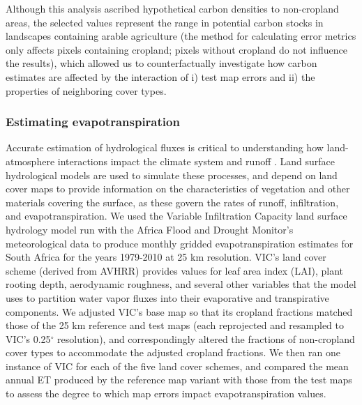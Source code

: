 \documentclass[12 pt, titlepage, a4paper]{article}
\begin{document}
Although this analysis ascribed hypothetical carbon densities to non-cropland areas, the selected values represent the range in potential carbon stocks in landscapes containing arable agriculture (the method for calculating error metrics only affects pixels containing cropland; pixels without cropland do not influence the results), which allowed us to counterfactually investigate how carbon estimates are affected by the interaction of i) test map errors and ii) the properties of neighboring cover types. 

\vspace{-0.3 cm}
\subsubsection*{Estimating evapotranspiration}
\vspace{-0.2 cm}
Accurate estimation of hydrological fluxes is critical to understanding how land-atmosphere interactions impact the climate system and runoff \citep{liang_simple_1994}. Land surface hydrological models are used to simulate these processes, and depend on land cover maps to provide information on the characteristics of vegetation and other materials covering the surface, as these govern the rates of runoff, infiltration, and evapotranspiration. We used the Variable Infiltration Capacity \citep[VIC;][]{liang_simple_1994} land surface hydrology model run with the Africa Flood and Drought Monitor's meteorological data \citep{sheffield_drought_2013} to produce monthly gridded evapotranspiration estimates for South Africa for the years 1979-2010 at 25 km resolution. VIC's land cover scheme (derived from AVHRR) provides values for leaf area index (LAI), plant rooting depth, aerodynamic roughness, and several other variables that the model uses to partition water vapor fluxes into their evaporative and transpirative components. We adjusted VIC's base map so that its cropland fractions matched those of the 25 km reference and test maps (each reprojected and resampled to VIC's 0.25$^{\circ}$ resolution), and correspondingly altered the fractions of non-cropland cover types to accommodate the adjusted cropland fractions. We then ran one instance of VIC for each of the five land cover schemes, and compared the mean annual ET produced by the reference map variant with those from the test maps to assess the degree to which map errors impact evapotranspiration values. 

\vspace{-0.3 cm}
\end{document}
